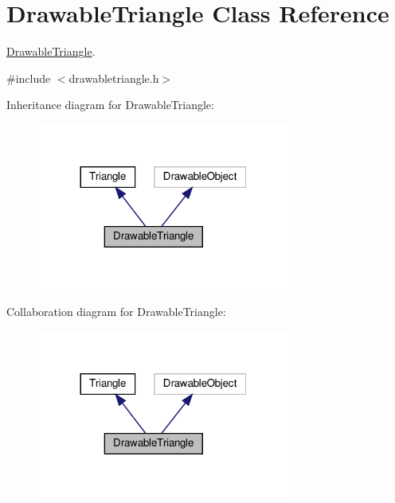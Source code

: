 \hypertarget{classDrawableTriangle}{}\section{Drawable\+Triangle Class Reference}
\label{classDrawableTriangle}


\hyperlink{classDrawableTriangle}{Drawable\+Triangle}.  




{\ttfamily \#include $<$drawabletriangle.\+h$>$}



Inheritance diagram for Drawable\+Triangle\+:
\nopagebreak
\begin{figure}[H]
\begin{center}
\leavevmode
\includegraphics[width=236pt]{classDrawableTriangle__inherit__graph}
\end{center}
\end{figure}


Collaboration diagram for Drawable\+Triangle\+:
\nopagebreak
\begin{figure}[H]
\begin{center}
\leavevmode
\includegraphics[width=236pt]{classDrawableTriangle__coll__graph}
\end{center}
\end{figure}
